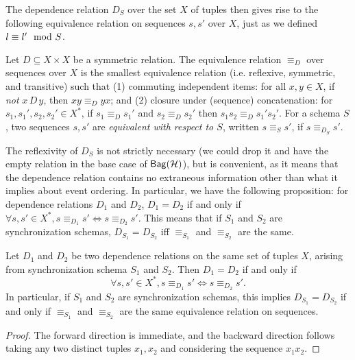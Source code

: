 The dependence relation $D_{S}$ over the set $X$ of tuples then gives rise to the following equivalence relation on sequences
$s, s'$ over $X$,
just as we defined $l \equiv l' \mod {S}$.
\begin{definition}
    Let $D \subseteq X \times X$ be a symmetric relation.
    The equivalence relation $\equiv_D$ over sequences over $X$ is
    the smallest equivalence relation (i.e. reflexive, symmetric, and transitive) such that (1)
    commuting independent items: for all $x, y \in X$, if \emph{not} $x\, D\, y$, then $x y \equiv_D y x$;
    and (2) closure under (sequence) concatenation: for $s_1, s_1', s_2, s_2' \in X^{*}$, if $s_1 \equiv_D s_1'$ and $s_2 \equiv_D s_2'$ then $s_1 s_2 \equiv_D s_1' s_2'$.
    For a schema $S$, two sequences $s, s'$ are \emph{equivalent with respect to $S$}, written $s \equiv_S s'$, if $s \equiv_{D_S} s'$.
    \end{definition}

The reflexivity of $D_{S}$ is not strictly necessary (we could drop it and have the empty relation in the base case of $\mathsf{Bag}({\mathcal{H}})$), but is convenient, as it means that the dependence relation contains no extraneous information other than what it implies about event ordering.
In particular,
we have the following proposition:
for dependence relations $D_1$ and $D_2$, $D_1 = D_2$ if and only if
$\forall s, s' \in X^{*}, s \equiv_{D_1} s' \iff s \equiv_{D_2} s'$.
This means that if $S_1$ and $S_2$ are synchronization schemas,
$D_{S_1} = D_{S_2}$ iff $\equiv_{S_1}$ and $\equiv_{S_2}$ are the same.

\begin{proposition}
\label{prop:why-reflexive}
Let $D_1$ and $D_2$ be two dependence relations on the same set of tuples $X$,
arising from synchronization schema $S_1$ and $S_2$.
Then $D_1 = D_2$ if and only if
\[
    \forall s, s' \in X^{*}, s \equiv_{D_1} s' \iff s \equiv_{D_2} s'.
\]
In particular, if $S_1$ and $S_2$ are synchronization schemas, this implies
$D_{S_1} = D_{S_2}$ if and only if $\equiv_{S_1}$ and $\equiv_{S_2}$ are the same equivalence relation on sequences.
\end{proposition}
\begin{proof}
The forward direction is immediate, and the backward direction follows
taking any two distinct tuples $x_1, x_2$ and considering the sequence $x_1 x_2$.
\end{proof}

